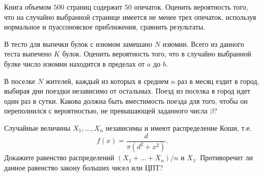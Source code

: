 \begin{problem}
Книга объемом $500$ страниц содержит $50$ опечаток. Оценить вероятность того, что на случайно выбранной странице 
имеется не менее трех опечаток, используя нормальное и пуассоновское приближения, сравнить результаты. 
\end{problem}

\begin{problem}
В тесто для выпечки булок с изюмом замешано $N$ изюмин. Всего из данного теста выпечено $K$ булок. Оценить вероятность того, 
что в случайно выбранной булке число изюмин находится в пределах от $a$ до $b$. 
\end{problem}

\begin{problem}
В поселке $N$ жителей, каждый из которых в среднем $n$ раз в месяц ездит в город, выбирая дни поездки независимо от остальных. 
Поезд из поселка в город идет один раз в сутки. Какова должна быть вместимость поезда для того, чтобы он переполнился с вероятностью, 
не превышающей заданного числа $\beta$? 
\end{problem}

\begin{problem}
Случайные величины $X_1,\ldots,X_n$ независимы и имеют распределение Коши, т.е. 
\[
f(x) = \frac{d}{\pi(d^2 + x^2)}.
\]
Докажите равенство распределений $(X_1+\ldots+X_n)/n$ и  $X_1$. Противоречит ли данное равенство закону больших чисел или ЦПТ?
\end{problem}


